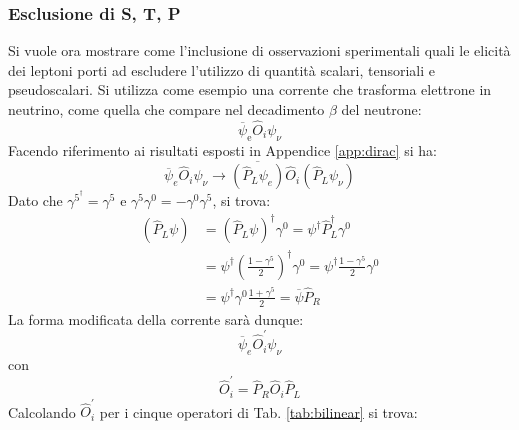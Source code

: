 \documentclass{subnucbo}
\begin{document}
\subsubsection{Esclusione di S, T, P}
Si vuole ora mostrare come l'inclusione di osservazioni sperimentali quali le elicità dei leptoni porti ad escludere l'utilizzo di quantità scalari, tensoriali e pseudoscalari. Si utilizza come esempio una corrente che trasforma elettrone in neutrino, come quella che compare nel decadimento $\beta$ del neutrone:
\begin{equation}
        \overline { \psi } _ { \mathrm { e } } \hat { O } _ { i } \psi _ { \nu }
        \label{eq:e_nu_current}
\end{equation}
Facendo riferimento ai risultati esposti in Appendice \ref{app:dirac} si ha:
\begin{equation}
        \overline { \psi} _ {e} \hat { O } _ { i } \psi _ { \nu } \rightarrow \overline { \left( \hat { P } _ { L }  \psi_ {e} \right) } \hat { O } _ { i } \left( \hat { P } _ { L } \psi _ { \nu } \right)
\end{equation}
Dato che $\gamma ^ { 5 } ^ { \dagger } = \gamma ^ { 5 }$ e $\gamma ^ { 5 } \gamma ^ { 0 } = - \gamma ^ { 0 } \gamma ^{ 5 }$, si trova:
\begin{equation}
        \begin{aligned}
                \left( \hat { P } _ { L } \psi \right) & = \left( \hat { P } _ { L }  \psi \right) ^ { \dagger } \gamma ^ { 0 } = \psi ^ { \dagger } \hat { P } _ { L } ^ { \dagger } \gamma ^ { 0 } \\ & = \psi ^ { \dagger } \left( \frac { 1 - \gamma ^ { 5 } } { 2 } \right) ^ { \dagger } \gamma ^ { 0 } = \psi ^ { \dagger } \frac { 1 - \gamma ^ { 5 } } { 2 } \gamma ^ { 0 } \\ & = \psi ^ { \dagger } \gamma ^ { 0 } \frac { 1 + \gamma ^ { 5 } } { 2 } = \overline { \psi } \hat { P } _ { R }
        \end{aligned}
\end{equation}
La forma modificata della corrente sarà dunque:
\begin{equation}
        \overline { \psi } _ {e} \hat { O } _ { i } ^ { \prime } \psi _ { \nu }
\end{equation}
con
\begin{equation}
        \hat { O } _ { i } ^ { \prime } = \hat { P } _ { R } \hat { O } _ { i } \hat { P } _ { L }
\end{equation}
Calcolando $\hat { O } _ { i } ^ { \prime }$ per i cinque operatori di Tab. \ref{tab:bilinear} si trova:
\end{document}

